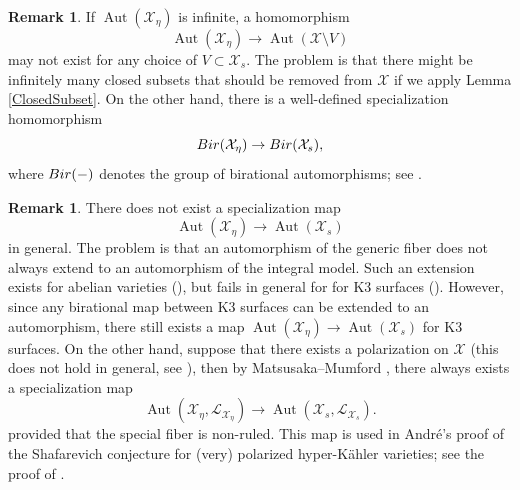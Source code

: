 \documentclass[11pt,reqno,oneside]{amsart}
\numberwithin{equation}{section}
\theoremstyle{definition}
\newtheorem{remark}[theorem]{Remark}
\DeclareMathOperator{\Aut}{Aut}
\newcommand{\Bir}{{\rm Bir}}
\begin{document}
\begin{remark}
If $\Aut(\mathcal{X}_{\eta})$ is infinite,
a homomorphism
\[
\Aut(\mathcal{X}_{\eta}) \to \Aut(\mathcal{X} \setminus V)
\]
may not exist for any choice of $V \subset \mathcal{X}_s$.
The problem is that there might be infinitely many closed subsets
that should be removed from $\mathcal{X}$
if we apply Lemma  \ref{ClosedSubset}.
On the other hand, there is a well-defined specialization homomorphism
\[ \Bir(\mathcal{X}_{\eta}) \to \Bir(\mathcal{X}_s), \]
where $\Bir(-)$
denotes the group of birational automorphisms;
see \cite[p.\ 191-192, Exercises 1.17]{Kollar-RationalCurvesBook}.
\end{remark}

\begin{remark}
There does not exist a specialization map
\[ \Aut(\mathcal{X}_{\eta}) \to \Aut(\mathcal{X}_s) \]
in general.
The problem is that an automorphism of the generic fiber
does not always extend to an automorphism of the integral model.
Such an extension exists for abelian varieties (\cite[Theorem 1.4.3]{BLR90}), but fails in general for 
for K3 surfaces (\cite[Example 5.4]{LM18}). 
However, since any birational map between K3 surfaces can be extended to an automorphism, there still exists a map $\Aut(\mathcal{X}_{\eta}) \to \Aut(\mathcal{X}_s)$ for K3 surfaces.
On the other hand, suppose that there exists a polarization on $\mathcal{X}$ (this does not hold in general, see \cite[Example 5.2]{Matsumoto2015}), then by Matsusaka--Mumford \cite[Theorem 2]{MM64},
there always exists a specialization map
\[
\Aut(\mathcal{X}_{\eta}, \mathcal{L}_{\mathcal{X}_{\eta}}) \to
\Aut(\mathcal{X}_{s}, \mathcal{L}_{\mathcal{X}_{s}}).
\]
provided that the special fiber is non-ruled.
This map is used in Andr\'e's proof of the Shafarevich
conjecture for (very) polarized hyper-Kähler varieties;
see the proof of \cite[Lemma 9.3.1]{A96}.
\end{remark}




\end{document}
